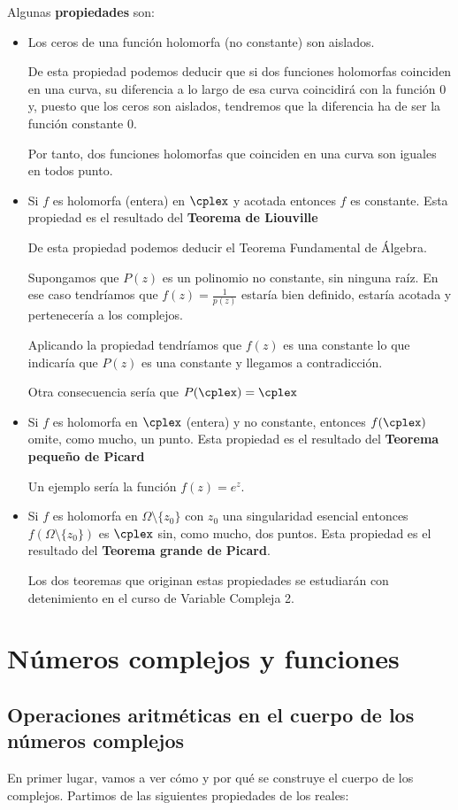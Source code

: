 \documentclass{apuntes}
\begin{document}
Algunas \textbf{propiedades} son:
\begin{itemize}
\item Los ceros de una función holomorfa (no constante) son aislados.

De esta propiedad podemos deducir que si dos funciones holomorfas coinciden en una curva, su diferencia a lo largo de esa curva coincidirá con la función 0 y, puesto que los ceros son aislados, tendremos que la diferencia ha de ser la función constante 0.

Por tanto, dos funciones holomorfas que coinciden en una curva son iguales en todos punto.

\item Si $f$ es holomorfa (entera) en $\cplex$ y acotada entonces $f$ es constante. Esta propiedad es el resultado del \textbf{Teorema de Liouville}

De esta propiedad podemos deducir el Teorema Fundamental de Álgebra.

Supongamos que $P(z)$ es un polinomio no constante, sin ninguna raíz. En ese caso tendríamos que $f(z)=\frac{1}{p(z)}$ estaría bien definido, estaría acotada y pertenecería a los complejos.

Aplicando la propiedad tendríamos que $f(z)$ es una constante lo que indicaría que $P(z)$ es una constante y llegamos a contradicción.

Otra consecuencia sería que $P(\cplex)=\cplex$

\item Si $f$ es holomorfa en $\cplex$  (entera) y no constante, entonces $f(\cplex)$ omite, como mucho, un punto. Esta propiedad es el resultado del \textbf{Teorema pequeño de Picard}

Un ejemplo sería la función $f(z)=e^z$.

\item Si $f$ es holomorfa en $\Omega\setminus \{z_0\}$ con $z_0$ una singularidad esencial entonces $f(\Omega\setminus \{z_0\})$ es $\cplex$ sin, como mucho, dos puntos. Esta propiedad es el resultado del \textbf{Teorema grande de Picard}.

Los dos teoremas que originan estas propiedades se estudiarán con detenimiento en el curso de Variable Compleja 2.
\end{itemize}

\chapter{Números complejos y funciones}
\section{Operaciones aritméticas en el cuerpo de los números complejos}
En primer lugar, vamos a ver cómo y por qué se construye el cuerpo de los complejos.
Partimos de las siguientes propiedades de los reales:
\end{document}
